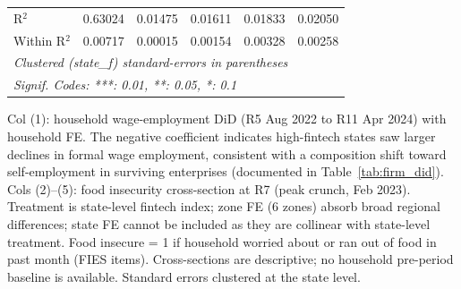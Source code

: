 \begin{tabular}{lccccc}
   R$^2$                              & 0.63024         & 0.01475     & 0.01611     & 0.01833       & 0.02050\\  
   Within R$^2$                       & 0.00717         & 0.00015     & 0.00154     & 0.00328       & 0.00258\\  
   \midrule \midrule
   \multicolumn{6}{l}{\emph{Clustered (state\_f) standard-errors in parentheses}}\\
   \multicolumn{6}{l}{\emph{Signif. Codes: ***: 0.01, **: 0.05, *: 0.1}}\\
\end{tabular}
 
\par \raggedright 
Col (1): household wage-employment DiD (R5 Aug 2022 to R11 Apr 2024) with household FE. The negative coefficient indicates high-fintech states saw larger declines in formal wage employment, consistent with a composition shift toward self-employment in surviving enterprises (documented in Table~\ref{tab:firm_did}). Cols (2)--(5): food insecurity cross-section at R7 (peak crunch, Feb 2023). Treatment is state-level fintech index; zone FE (6 zones) absorb broad regional differences; state FE cannot be included as they are collinear with state-level treatment. Food insecure = 1 if household worried about or ran out of food in past month (FIES items). Cross-sections are descriptive; no household pre-period baseline is available. Standard errors clustered at the state level.
\par\endgroup


